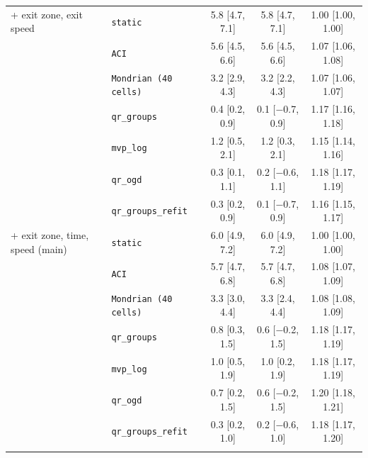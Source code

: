 \begin{tabular}{@{}llccc@{}}
\addlinespace
+ exit zone, exit speed & \texttt{static} & 5.8 [4.7, 7.1] & 5.8 [4.7, 7.1] & 1.00 [1.00, 1.00] \\
 & \texttt{ACI} & 5.6 [4.5, 6.6] & 5.6 [4.5, 6.6] & 1.07 [1.06, 1.08] \\
 & \texttt{Mondrian (40 cells)} & 3.2 [2.9, 4.3] & 3.2 [2.2, 4.3] & 1.07 [1.06, 1.07] \\
 & \texttt{qr\_groups} & 0.4 [0.2, 0.9] & 0.1 [$-$0.7, 0.9] & 1.17 [1.16, 1.18] \\
 & \texttt{mvp\_log} & 1.2 [0.5, 2.1] & 1.2 [0.3, 2.1] & 1.15 [1.14, 1.16] \\
 & \texttt{qr\_ogd} & 0.3 [0.1, 1.1] & 0.2 [$-$0.6, 1.1] & 1.18 [1.17, 1.19] \\
 & \texttt{qr\_groups\_refit} & 0.3 [0.2, 0.9] & 0.1 [$-$0.7, 0.9] & 1.16 [1.15, 1.17] \\
\addlinespace
+ exit zone, time, speed (main) & \texttt{static} & 6.0 [4.9, 7.2] & 6.0 [4.9, 7.2] & 1.00 [1.00, 1.00] \\
 & \texttt{ACI} & 5.7 [4.7, 6.8] & 5.7 [4.7, 6.8] & 1.08 [1.07, 1.09] \\
 & \texttt{Mondrian (40 cells)} & 3.3 [3.0, 4.4] & 3.3 [2.4, 4.4] & 1.08 [1.08, 1.09] \\
 & \texttt{qr\_groups} & 0.8 [0.3, 1.5] & 0.6 [$-$0.2, 1.5] & 1.18 [1.17, 1.19] \\
 & \texttt{mvp\_log} & 1.0 [0.5, 1.9] & 1.0 [0.2, 1.9] & 1.18 [1.17, 1.19] \\
 & \texttt{qr\_ogd} & 0.7 [0.2, 1.5] & 0.6 [$-$0.2, 1.5] & 1.20 [1.18, 1.21] \\
 & \texttt{qr\_groups\_refit} & 0.3 [0.2, 1.0] & 0.2 [$-$0.6, 1.0] & 1.18 [1.17, 1.20] \\
\addlinespace
\bottomrule
\end{tabular}
